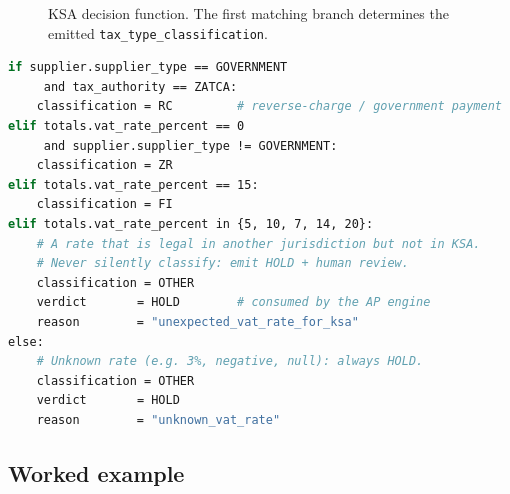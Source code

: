 \documentclass[11pt,a4paper,twoside]{report}
\begin{document}
\begin{figure}[htbp]
\centering
{}
\caption{KSA decision function. The first matching branch determines
         the emitted \texttt{tax\_type\_classification}.}
\label{fig:ksa-decision}
\end{figure}

\begin{lstlisting}[language=bash,basicstyle=\ttfamily\small,caption={KSA
decision logic applied to a validated invoice record.}]
if supplier.supplier_type == GOVERNMENT
     and tax_authority == ZATCA:
    classification = RC         # reverse-charge / government payment
elif totals.vat_rate_percent == 0
     and supplier.supplier_type != GOVERNMENT:
    classification = ZR
elif totals.vat_rate_percent == 15:
    classification = FI
elif totals.vat_rate_percent in {5, 10, 7, 14, 20}:
    # A rate that is legal in another jurisdiction but not in KSA.
    # Never silently classify: emit HOLD + human review.
    classification = OTHER
    verdict       = HOLD        # consumed by the AP engine
    reason        = "unexpected_vat_rate_for_ksa"
else:
    # Unknown rate (e.g. 3%, negative, null): always HOLD.
    classification = OTHER
    verdict       = HOLD
    reason        = "unknown_vat_rate"
\end{lstlisting}

\subsection{Worked example}
\end{document}

